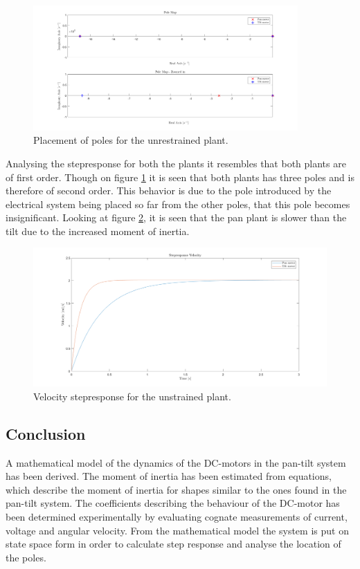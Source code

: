 \documentclass[../../main.tex]{subfiles}
\begin{document}
\begin{figure}
    \centering
    \includegraphics[width = 0.9\textwidth]{Sections/System_Modelling/Images/polesPlant.png}
    \caption{Placement of poles for the unrestrained plant.}
    \label{fig:polesPlant}
\end{figure}

Analysing the stepresponse for both the plants it resembles that both plants are of first order. Though on figure \ref{fig:polesPlant} it is seen that both plants has three poles and is therefore of second order. This behavior is due to the pole introduced by the electrical system being placed so far from the other poles, that this pole becomes insignificant. Looking at figure \ref{fig:StepVelPlant}, it is seen that the pan plant is slower than the tilt due to the increased moment of inertia.  
 

\begin{figure}
    \centering
    \includegraphics[width = 0.9 \textwidth]{Sections/System_Modelling/Images/stepResponseVelPlant.png}
    \caption{Velocity stepresponse for the unstrained plant.}
    \label{fig:StepVelPlant}
\end{figure}



\subsection{Conclusion}

 A mathematical model of the dynamics of the DC-motors in the pan-tilt system has been derived. The moment of inertia has been estimated from equations, which describe the moment of inertia for shapes similar to the ones found in the pan-tilt system. The coefficients describing the behaviour of the DC-motor has been determined experimentally by evaluating cognate measurements of current, voltage and angular velocity. From the mathematical model the system is put on state space form in order to calculate step response and analyse the location of the poles.
\end{document}
